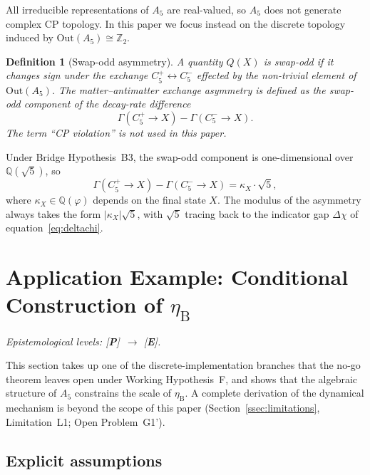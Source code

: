 \documentclass[sn-mathphys-num,Numbered]{sn-jnl}
\theoremstyle{thmstyleone}
\theoremstyle{thmstylethree}
\newtheorem{definition}[theorem]{Definition}
\theoremstyle{thmstyletwo}
\newcommand{\etaB}{\eta_{\mathrm{B}}}
\newcommand{\Qsqrt}{\mathbb{Q}(\sqrt{5})}
\newcommand{\tagP}{[\textbf{P}]}
\newcommand{\tagE}{[\textbf{E}]}
\begin{document}
All irreducible representations of $A_5$ are real-valued, so $A_5$
does not generate complex CP topology.  In this paper we focus instead
on the discrete topology induced by $\mathrm{Out}(A_5) \cong
\mathbb{Z}_2$.

\begin{definition}[Swap-odd asymmetry]
\label{def:swap-odd}
A quantity $Q(X)$ is \emph{swap-odd} if it changes sign under the
exchange $C_5^+ \leftrightarrow C_5^-$ effected by the non-trivial
element of $\mathrm{Out}(A_5)$.  The \emph{matter--antimatter exchange
asymmetry} is defined as the swap-odd component of the decay-rate
difference
\[
  \Gamma(C_5^+ \to X) - \Gamma(C_5^- \to X).
\]
The term ``CP violation'' is not used in this paper.
\end{definition}

Under Bridge Hypothesis~B3, the swap-odd component is one-dimensional
over $\Qsqrt$, so
\begin{equation}
  \Gamma(C_5^+ \to X) - \Gamma(C_5^- \to X) = \kappa_X \cdot \sqrt{5},
  \label{eq:swap-odd}
\end{equation}
where $\kappa_X \in \mathbb{Q}(\varphi)$ depends on the final state
$X$.  The modulus of the asymmetry always takes the form
$|\kappa_X|\sqrt{5}$, with $\sqrt{5}$ tracing back to the indicator gap
$\Delta\chi$ of equation~\eqref{eq:deltachi}.
\section{Application Example: Conditional Construction of
  \texorpdfstring{$\etaB$}{etaB}}
\label{sec:application}

\noindent\textit{Epistemological levels: \tagP\ $\to$ \tagE.}

\medskip\noindent
This section takes up one of the discrete-implementation branches that
the no-go theorem leaves open under Working Hypothesis~F, and shows
that the algebraic structure of $A_5$ constrains the scale of $\etaB$.
A complete derivation of the dynamical mechanism is beyond the scope of
this paper (Section~\ref{ssec:limitations}, Limitation~L1;
Open Problem~G1').

\subsection{Explicit assumptions}
\label{ssec:assumptions}
\end{document}
